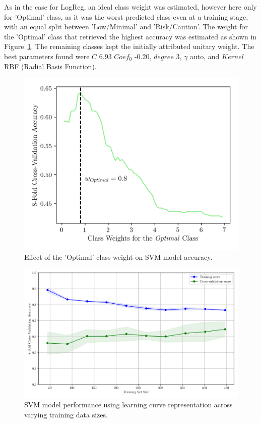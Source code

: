\documentclass[conference]{IEEEtran}
\begin{document}
As in the case for LogReg, an ideal class weight was estimated, however here only for 'Optimal' class, as it was the worst predicted class even at a training stage, with an equal split between 'Low/Minimal' and 'Risk/Caution'. The weight for the 'Optimal' class that retrieved the highest accuracy was estimated as shown in Figure~\ref{svm_weight}. The remaining classes kept the initially attributed unitary weight.
The best parameters found were $C$ 6.93 $Coef_0$ -0.20, $degree$ 3, $\gamma$ auto, and $Kernel$ RBF (Radial Basis Function).


\begin{figure}[H]
    \centering
    \includegraphics[width=1\linewidth]{assets/SVM_OptimalWeight.png}
    \caption{Effect of the 'Optimal' class weight on SVM model accuracy.}
    \label{svm_weight}
\end{figure}


\begin{figure}[H]
    \centering
    \includegraphics[width=1\linewidth]{assets/SVM_LearningCurve.png}
    \caption{SVM model performance using learning curve representation across varying training data sizes.}
    \label{svm_learningcurve}
\end{figure}
\end{document}
